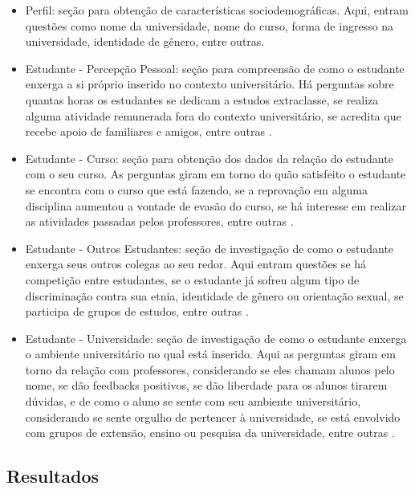 \documentclass[12pt]{article}
\begin{document}
\begin{itemize}
    \item Perfil: seção para obtenção de características sociodemográficas. Aqui, entram questões como nome da universidade, nome do curso, forma de ingresso na universidade, identidade de gênero, entre outras.
    
    \item Estudante - Percepção Pessoal: seção para compreensão de como o estudante enxerga a si próprio inserido no contexto universitário. Há perguntas sobre quantas horas os estudantes se dedicam a estudos extraclasse, se realiza alguma atividade remunerada fora do contexto universitário, se acredita que recebe apoio de familiares e amigos, entre outras \cite{Staehr2001}. 

    \item Estudante - Curso: seção para obtenção dos dados da relação do estudante com o seu curso. As perguntas giram em torno do quão satisfeito o estudante se encontra com o curso que está fazendo, se a reprovação em alguma disciplina aumentou a vontade de evasão do curso, se há interesse em realizar as atividades passadas pelos professores, entre outras \cite{Staehr2001, Giannakos2016}.
    
    \item Estudante - Outros Estudantes: seção de investigação de como o estudante enxerga seus outros colegas ao seu redor. Aqui entram questões se há competição entre estudantes, se o estudante já sofreu algum tipo de discriminação contra sua etnia, identidade de gênero ou orientação sexual, se participa de grupos de estudos, entre outras \cite{Staehr2001, Giannakos2016}.
    
    \item Estudante - Universidade: seção de investigação de como o estudante enxerga o ambiente universitário no qual está inserido. Aqui as perguntas giram em torno da relação com professores, considerando se eles chamam alunos pelo nome, se dão feedbacks positivos, se dão liberdade para os alunos tirarem dúvidas, e de como o aluno se sente com seu ambiente universitário, considerando se sente orgulho de pertencer à universidade, se está envolvido com grupos de extensão, ensino ou pesquisa da universidade, entre outras \cite{Giannakos2016}.
\end{itemize}

\subsection{Resultados}
\end{document}
